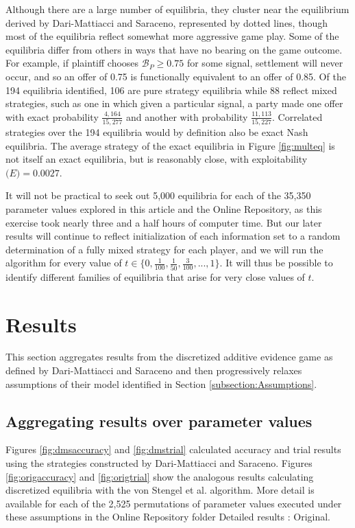 \documentclass{article}
\begin{document}
Although there are a large number of equilibria, they cluster near the equilibrium derived by Dari-Mattiacci and Saraceno, represented by dotted lines, though most of the equilibria reflect somewhat more aggressive game play. Some of the equilibria differ from others in ways that have no bearing on the game outcome. For example, if plaintiff chooses $\mathcal{B}_P \geq 0.75$ for some signal, settlement will never occur, and so an offer of 0.75 is functionally equivalent to an offer of 0.85. Of the 194 equilibria identified, 106 are pure strategy equilibria while 88 reflect mixed strategies, such as one in which given a particular signal, a party made one offer with exact probability $\frac{4,164}{15,277}$ and another with probability $\frac{11,113}{15,227}$. Correlated strategies over the 194 equilibria would by definition also be exact Nash equilibria. The average strategy of the exact equilibria in Figure \ref{fig:multeq} is not itself an exact equilibria, but is reasonably close, with exploitability $\mathcal(E)=0.0027$. 

It will not be practical to seek out 5,000 equilibria for each of the 35,350 parameter values explored in this article and the Online Repository, as this exercise took nearly three and a half hours of computer time. But our later results will continue to reflect initialization of each information set to a random determination of a fully mixed strategy for each player, and we will run the algorithm for every value of $t \in \{0, \frac{1}{100}, \frac{1}{50}, \frac{3}{100}, ... , 1\}$. It will thus be possible to identify different families of equilibria that arise for very close values of $t$.

\section{Results} \label{section:Results}

This section aggregates results from the discretized additive evidence game as defined by Dari-Mattiacci and Saraceno and then progressively relaxes assumptions of their model identified in Section \ref{subsection:Assumptions}.

\subsection{Aggregating results over parameter values}

Figures \ref{fig:dmsaccuracy} and \ref{fig:dmstrial} calculated accuracy and trial results using the strategies constructed by Dari-Mattiacci and Saraceno. Figures \ref{fig:origaccuracy} and \ref{fig:origtrial} show the analogous results calculating discretized equilibria with the von Stengel et al. algorithm. More detail is available for each of the 2,525 permutations of parameter values executed under these assumptions in the Online Repository folder Detailed results : Original.
\end{document}
